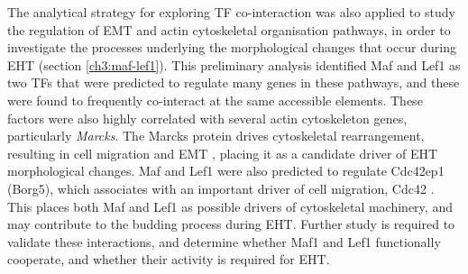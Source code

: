 The analytical strategy for exploring TF co-interaction was also applied to study the regulation of EMT and actin cytoskeletal organisation pathways, in order to investigate the processes underlying the morphological changes that occur during EHT (section \ref{ch3:maf-lef1}). This preliminary analysis identified Maf and Lef1 as two TFs that were predicted to regulate many genes in these pathways, and these were found to frequently co-interact at the same accessible elements. These factors were also highly correlated with several actin cytoskeleton genes, particularly \textit{Marcks}. The Marcks protein drives cytoskeletal rearrangement, resulting in cell migration and EMT \citep{el_amri_marcks_2018, xiang_myristoylated_2019}, placing it as a candidate driver of EHT morphological changes. Maf and Lef1 were also predicted to regulate Cdc42ep1 (Borg5), which associates with an important driver of cell migration, Cdc42 \citep{liu_borg5_2014, farrugia_borg_2016, watson_cdc42_2016}. This places both Maf and Lef1 as possible drivers of cytoskeletal machinery, and may contribute to the budding process during EHT. Further study is required to validate these interactions, and determine whether Maf1 and Lef1 functionally cooperate, and whether their activity is required for EHT.

